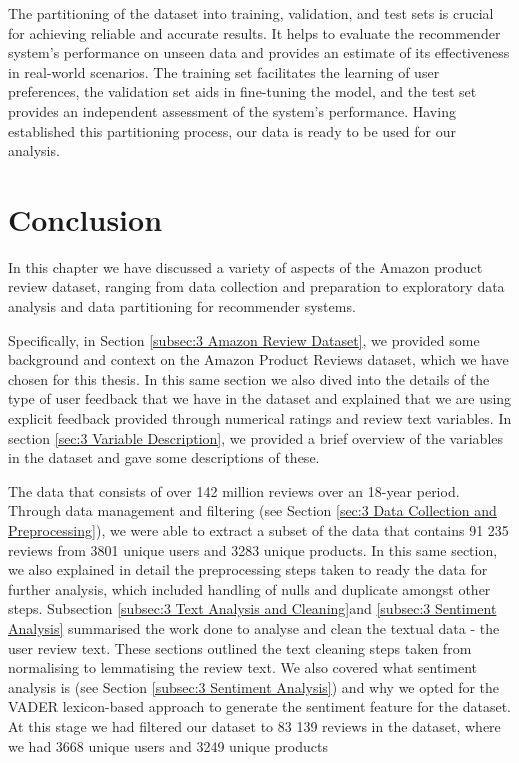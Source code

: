   The partitioning of the dataset into training, validation, and test sets is crucial for achieving reliable and accurate results. It helps to evaluate the recommender system's performance on unseen data and provides an estimate of its effectiveness in real-world scenarios. The training set facilitates the learning of user preferences, the validation set aids in fine-tuning the model, and the test set provides an independent assessment of the system's performance. Having established this partitioning process, our data is ready to be used for our analysis. 




\section{Conclusion}
\label{sec:3 Conclusion}

In this chapter we have discussed a variety of aspects of the Amazon product review dataset, ranging from data collection and preparation to exploratory data analysis and data partitioning for recommender systems. 

Specifically, in Section \ref{subsec:3 Amazon Review Dataset}, we provided some background and context on the Amazon Product Reviews dataset, which we have chosen for this thesis. In this same section we also dived into the details of the type of user feedback that we have in the dataset and explained that we are using explicit feedback provided through numerical ratings and review text variables. In section \ref{sec:3 Variable Description}, we provided a brief overview of the variables in the dataset and gave some descriptions of these. 

The data that consists of over 142 million reviews over an 18-year period. Through data management and filtering (see Section \ref{sec:3 Data Collection and Preprocessing}), we were able to extract a subset of the data that contains 91 235 reviews from 3801 unique users and 3283 unique products. In this same section, we also explained in detail the preprocessing steps taken to ready the data for further analysis, which included handling of nulls and duplicate amongst other steps. Subsection \ref{subsec:3 Text Analysis and Cleaning}and \ref{subsec:3 Sentiment Analysis} summarised the work done to analyse and clean the textual data - the user review text. These sections outlined the text cleaning steps taken from normalising  to lemmatising the review text. We also covered what sentiment analysis is (see Section \ref{subsec:3 Sentiment Analysis}) and why we opted for the VADER lexicon-based approach to generate the sentiment feature for the dataset. At this stage we had filtered our dataset to 83 139 reviews in the dataset, where we had 3668 unique users and 3249 unique products 

